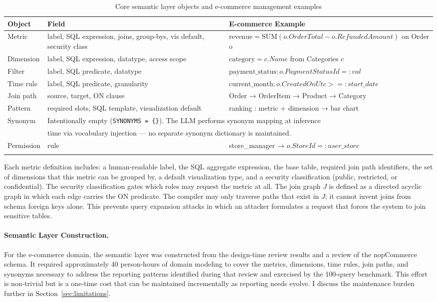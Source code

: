\documentclass[11pt]{article}
\begin{document}
\begin{longtable}{lll}
\toprule
\textbf{Object} & \textbf{Field} & \textbf{E-commerce Example}\\
\midrule
Metric & label, SQL expression, joins, group‑bys, vis default, security class & $\mathrm{revenue} = \mathrm{SUM}(o.OrderTotal - o.RefundedAmount)$ on Order o\\
Dimension & label, SQL expression, datatype, access scope & $\mathrm{category} = c.Name$ from Categories c\\
Filter & label, SQL predicate, datatype & $\mathrm{payment\_status} : o.PaymentStatusId = :val$\\
Time rule & label, SQL predicate, granularity & $\mathrm{current\_month} : o.CreatedOnUtc >= :start\_date$\\
Join path & source, target, ON clause & Order → OrderItem → Product → Category\\
Pattern & required slots, SQL template, visualization default & ranking : metric + dimension → bar chart\\
Synonym & \multicolumn{2}{l}{Intentionally empty (\texttt{SYNONYMS = \{\}}). The LLM performs synonym mapping at inference}\\
 & \multicolumn{2}{l}{time via vocabulary injection --- no separate synonym dictionary is maintained.}\\
Permission & rule & store\_manager → $o.StoreId = :user\_store$\\
\bottomrule
\caption{Core semantic layer objects and e-commerce management examples}\label{tab:semantic}
\end{longtable}

Each metric definition includes: a human‑readable label, the SQL aggregate expression, the base table, required join path identifiers, the set of dimensions that this metric can be grouped by, a default visualization type, and a security classification (public, restricted, or confidential). The security classification gates which roles may request the metric at all. The join graph $J$ is defined as a directed acyclic graph in which each edge carries the ON predicate. The compiler may only traverse paths that exist in $J$; it cannot invent joins from schema foreign keys alone. This prevents query expansion attacks in which an attacker formulates a request that forces the system to join sensitive tables.

\paragraph{Semantic Layer Construction.} For the e-commerce domain, the semantic layer was constructed from the design-time review results and a review of the nopCommerce schema. It required approximately 40 person‑hours of domain modeling to cover the metrics, dimensions, time rules, join paths, and synonyms necessary to address the reporting patterns identified during that review and exercised by the 100-query benchmark. This effort is non‑trivial but is a one‑time cost that can be maintained incrementally as reporting needs evolve. I discuss the maintenance burden further in Section~\ref{sec:limitations}.
\end{document}
